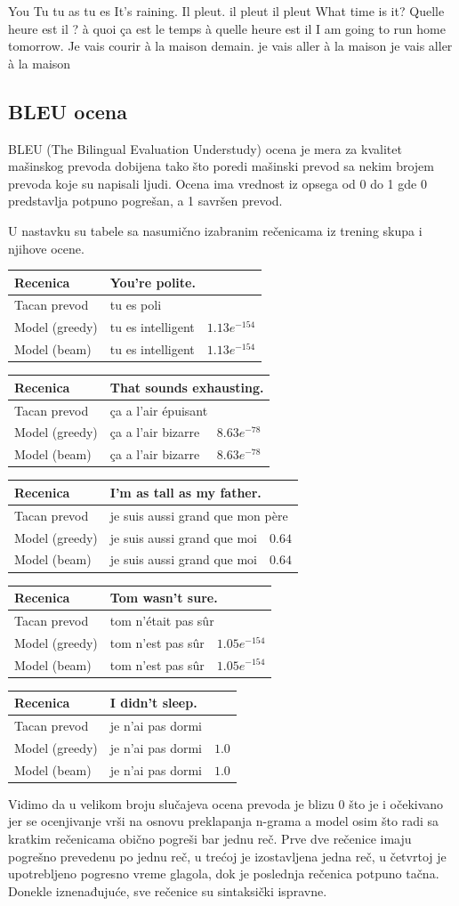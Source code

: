 \documentclass[a4paper]{article}
\begin{document}
\translation
{You}
{Tu}
{tu as}
{tu es}
\translation
{It's raining.}
{Il pleut.}
{il pleut}
{il pleut}
\translation
{What time is it?}
{Quelle heure est il ?}
{à quoi ça est le temps}
{à quelle heure est il}
\translation
{I am going to run home tomorrow.}
{Je vais courir à la maison demain.}
{je vais aller à la maison}
{je vais aller à la maison}

\subsection{BLEU ocena}

\newcommand\translationscore[6] 
{\begin{center}
  \begin{tabularx}{\textwidth}{ |l|X|l| } 
    \hline
    Recenica & \multicolumn{2}{|l|}{#1} \\
    \hline
    Tacan prevod & \multicolumn{2}{|l|}{#2} \\
    \hline
    Model (greedy) & #3 & #4 \\
    \hline
    Model (beam) & #5 & #6 \\
    \hline
  \end{tabularx}
\end{center}}

BLEU (The Bilingual Evaluation Understudy) ocena je mera za kvalitet mašinskog prevoda dobijena tako što poredi mašinski prevod sa nekim brojem prevoda koje su napisali ljudi. Ocena ima vrednost iz opsega od 0 do 1 gde 0 predstavlja potpuno pogrešan, a 1 savršen prevod.

U nastavku su tabele sa nasumično izabranim rečenicama iz trening skupa i njihove ocene.

\translationscore
{You're polite.}
{tu es poli}
{tu es intelligent}{$1.13e^{-154}$}
{tu es intelligent}{$1.13e^{-154}$}
\translationscore
{That sounds exhausting.}
{ça a l'air épuisant}
{ça a l'air bizarre}{$8.63e^{-78}$}
{ça a l'air bizarre}{$8.63e^{-78}$}
\translationscore
{I'm as tall as my father.}
{je suis aussi grand que mon père}
{je suis aussi grand que moi}{$0.64$}
{je suis aussi grand que moi}{$0.64$}
\translationscore
{Tom wasn't sure.}
{tom n'était pas sûr}
{tom n'est pas sûr}{$1.05e^{-154}$}
{tom n'est pas sûr}{$1.05e^{-154}$}
\translationscore
{I didn't sleep.}
{je n'ai pas dormi}
{je n'ai pas dormi}{$1.0$}
{je n'ai pas dormi}{$1.0$}

Vidimo da u velikom broju slučajeva ocena prevoda je blizu 0 što je i očekivano jer se ocenjivanje vrši na osnovu preklapanja n-grama a model osim što radi sa kratkim rečenicama obično pogreši bar jednu reč.
Prve dve rečenice imaju pogrešno prevedenu po jednu reč, u trećoj je izostavljena jedna reč, u četvrtoj je upotrebljeno pogresno vreme glagola, dok je poslednja rečenica potpuno tačna.
Donekle iznenađujuće, sve rečenice su sintaksički ispravne.
\end{document}
